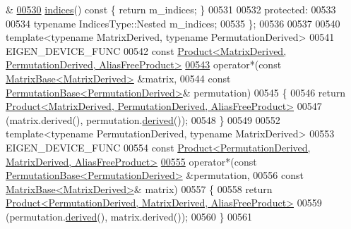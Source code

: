 \begin{DoxyCode}
      &
\hyperlink{group___core___module_a88ae93cc14c136b2eec4a286b4c10c34}{00530}     \hyperlink{group___core___module_a88ae93cc14c136b2eec4a286b4c10c34}{indices}()\textcolor{keyword}{ const }\{ \textcolor{keywordflow}{return} m\_indices; \}
00531 
00532   \textcolor{keyword}{protected}:
00533 
00534     \textcolor{keyword}{typename} IndicesType::Nested m\_indices;
00535 \};
00536 
00537 
00540 \textcolor{keyword}{template}<\textcolor{keyword}{typename} MatrixDerived, \textcolor{keyword}{typename} PermutationDerived>
00541 EIGEN\_DEVICE\_FUNC
00542 \textcolor{keyword}{const} \hyperlink{group___core___module_class_eigen_1_1_product}{Product<MatrixDerived, PermutationDerived, AliasFreeProduct>}
\hyperlink{namespace_eigen_a32970f7eb62fe31eeefee72d24a046d0}{00543} operator*(\textcolor{keyword}{const} \hyperlink{group___core___module_class_eigen_1_1_matrix_base}{MatrixBase<MatrixDerived>} &matrix,
00544           \textcolor{keyword}{const} \hyperlink{group___core___module_class_eigen_1_1_permutation_base}{PermutationBase<PermutationDerived>}& permutation)
00545 \{
00546   \textcolor{keywordflow}{return} \hyperlink{group___core___module_class_eigen_1_1_product}{Product<MatrixDerived, PermutationDerived, AliasFreeProduct>}
00547             (matrix.derived(), permutation.\hyperlink{group___core___module_a324b16961a11d2ecfd2d1b7dd7946545}{derived}());
00548 \}
00549 
00552 \textcolor{keyword}{template}<\textcolor{keyword}{typename} PermutationDerived, \textcolor{keyword}{typename} MatrixDerived>
00553 EIGEN\_DEVICE\_FUNC
00554 \textcolor{keyword}{const} \hyperlink{group___core___module_class_eigen_1_1_product}{Product<PermutationDerived, MatrixDerived, AliasFreeProduct>}
\hyperlink{namespace_eigen_a5954e0288e506706e8d2c8cd5ff5b7d2}{00555} operator*(\textcolor{keyword}{const} \hyperlink{group___core___module_class_eigen_1_1_permutation_base}{PermutationBase<PermutationDerived>} &permutation,
00556           \textcolor{keyword}{const} \hyperlink{group___core___module_class_eigen_1_1_matrix_base}{MatrixBase<MatrixDerived>}& matrix)
00557 \{
00558   \textcolor{keywordflow}{return} \hyperlink{group___core___module_class_eigen_1_1_product}{Product<PermutationDerived, MatrixDerived, AliasFreeProduct>}
00559             (permutation.\hyperlink{group___core___module_a324b16961a11d2ecfd2d1b7dd7946545}{derived}(), matrix.derived());
00560 \}
00561 

\end{DoxyCode}
